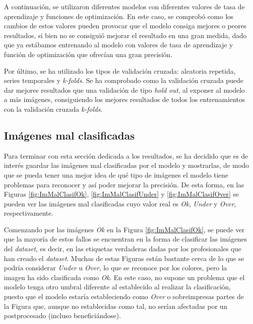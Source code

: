 \documentclass{report}
\begin{document}
A continuación, se utilizaron diferentes modelos con diferentes valores de tasa de aprendizaje y funciones de optimización. En este caso, se comprobó como los cambios de estos valores pueden provocar que el modelo consiga mejores o peores resultados, si bien no se consiguió mejorar el resultado en una gran medida, dado que ya estábamos entrenando al modelo con valores de tasa de aprendizaje y función de optimización que ofrecían una gran precisión.


Por último, se ha utilizado los tipos de validación cruzada: aleatoria repetida, series temporales y \textit{k-folds}. Se ha comprobado como la validación cruzada puede dar mejores resultados que una validación de tipo \textit{hold out}, al exponer al modelo a más imágenes, consiguiendo los mejores resultados de todos los entrenamientos con la validación cruzada \textit{k-folds}.




\subsection{Imágenes mal clasificadas}

Para terminar con esta sección dedicada a los resultados, se ha decidido que es de interés guardar las imágenes mal clasificadas por el modelo y mostrarlas, de modo que se pueda tener una mejor idea de qué tipo de imágenes el modelo tiene problemas para reconocer y así poder mejorar la precisión. De esta forma, en las Figuras \ref{fig:ImMalClasifOk}, \ref{fig:ImMalClasifUnder} y \ref{fig:ImMalClasifOver} se pueden ver las imágenes mal clasificadas cuyo valor real es \textit{Ok}, \textit{Under} y \textit{Over}, respectivamente. 



Comenzando por las imágenes \textit{Ok} en la Figura \ref{fig:ImMalClasifOk}, se puede ver que la mayoría de estos fallos se encuentran en la forma de clasificar las imágenes del \textit{dataset}, es decir, en las etiquetas verdaderas dadas por los profesionales que han creado el \textit{dataset}. Muchas de estas Figuras están bastante cerca de lo que se podría considerar \textit{Under} u \textit{Over}, lo que se reconoce por los colores, pero la imagen ha sido clasificada como \textit{Ok}. En este caso, no supone un problema que el modelo tenga otro umbral diferente al establecido al realizar la clasificación, puesto que el modelo estaría estableciendo como \textit{Over} o sobreimpresas partes de la Figura que, aunque no establecidas como tal, no serían afectadas por un postprocesado (incluso beneficiándose). 
\end{document}
